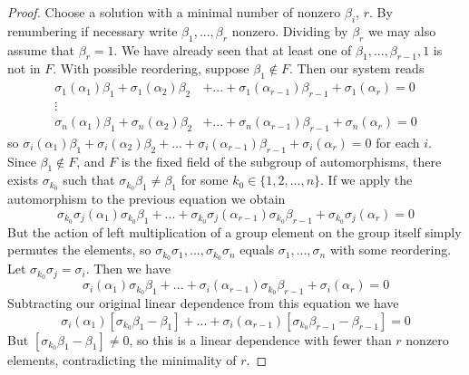 \begin{proof}
    Choose a solution with a minimal number of nonzero $\beta_i$, $r$. By renumbering if necessary write $\beta_1,...,\beta_r$ nonzero. Dividing by $\beta_r$ we may also assume that $\beta_r = 1$. We have already seen that at least one of $\beta_1,...,\beta_{r-1},1$ is not in $F$. With possible reordering, suppose $\beta_1 \notin F$. Then our system reads
    \begin{align*}
        \sigma_1(\alpha_1)\beta_1 + \sigma_1(\alpha_2)\beta_2&+...+\sigma_1(\alpha_{r-1})\beta_{r-1}+\sigma_1(\alpha_r) = 0 \\
        \vdots& \\
        \sigma_n(\alpha_1)\beta_1 + \sigma_n(\alpha_2)\beta_2&+...+\sigma_n(\alpha_{r-1})\beta_{r-1}+\sigma_n(\alpha_r)= 0 
    \end{align*}
    so $\sigma_i(\alpha_1)\beta_1 + \sigma_i(\alpha_2)\beta_2+...+\sigma_i(\alpha_{r-1})\beta_{r-1}+\sigma_i(\alpha_r) = 0$ for each $i$. Since $\beta_1 \notin F$, and $F$ is the fixed field of the subgroup of automorphisms, there exists $\sigma_{k_0}$ such that $\sigma_{k_0}\beta_1 \neq \beta_1$ for some $k_0 \in \{1,2,...,n\}$. If we apply the automorphism to the previous equation we obtain \begin{equation*}
        \sigma_{k_0}\sigma_j(\alpha_1)\sigma_{k_0}\beta_1 +...+\sigma_{k_0}\sigma_j(\alpha_{r-1})\sigma_{k_0}\beta_{r-1}+\sigma_{k_0}\sigma_j(\alpha_r) = 0
    \end{equation*}
    But the action of left multiplication of a group element on the group itself simply permutes the elements, so $\sigma_{k_0}\sigma_1,...,\sigma_{k_0}\sigma_n$ equals $\sigma_1,...,\sigma_n$ with some reordering. Let $\sigma_{k_0}\sigma_j = \sigma_i$. Then we have \begin{equation*}
        \sigma_i(\alpha_1)\sigma_{k_0}\beta_1 +...+\sigma_i(\alpha_{r-1})\sigma_{k_0}\beta_{r-1}+\sigma_i(\alpha_r) = 0
    \end{equation*}
    Subtracting our original linear dependence from this equation we have \begin{equation*}
        \sigma_i(\alpha_1)[\sigma_{k_0}\beta_1-\beta_1] +...+\sigma_i(\alpha_{r-1})[\sigma_{k_0}\beta_{r-1}-\beta_{r-1}]= 0
    \end{equation*}
    But $[\sigma_{k_0}\beta_1 - \beta_1] \neq 0$, so this is a linear dependence with fewer than $r$ nonzero elements, contradicting the minimality of $r$.
\end{proof}


